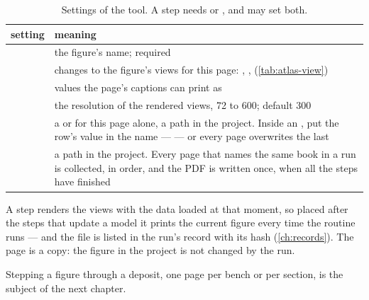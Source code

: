 \begin{table}[htbp]\small
\begin{tabularx}{\linewidth}{@{}lL@{}}\toprule
setting & meaning \\ \midrule
{} & the figure's name; required \\
 & changes to the figure's views for this page: , ,  (\cref{tab:atlas-view}) \\
 & values the page's captions can print as  \\
 & the resolution of the rendered views, 72 to 600; default 300 \\
 & a  or  for this page alone, a path in the project. Inside an , put the row's value in the name —  — or every page overwrites the last \\
 & a  path in the project. Every page that names the same book in a run is collected, in order, and the PDF is written once, when all the steps have finished \\ \bottomrule
\end{tabularx}
\caption{Settings of the  tool. A step needs  or , and may set both.}\label{tab:compo-tool}
\end{table}

A  step renders the views with the data loaded at that moment, so placed after the steps that update a model it prints the current figure every time the routine runs — and the file is listed in the run's record with its hash (\cref{ch:records}). The page is a copy: the figure in the project is not changed by the run.

Stepping a figure through a deposit, one page per bench or per section, is the subject of the next chapter.
